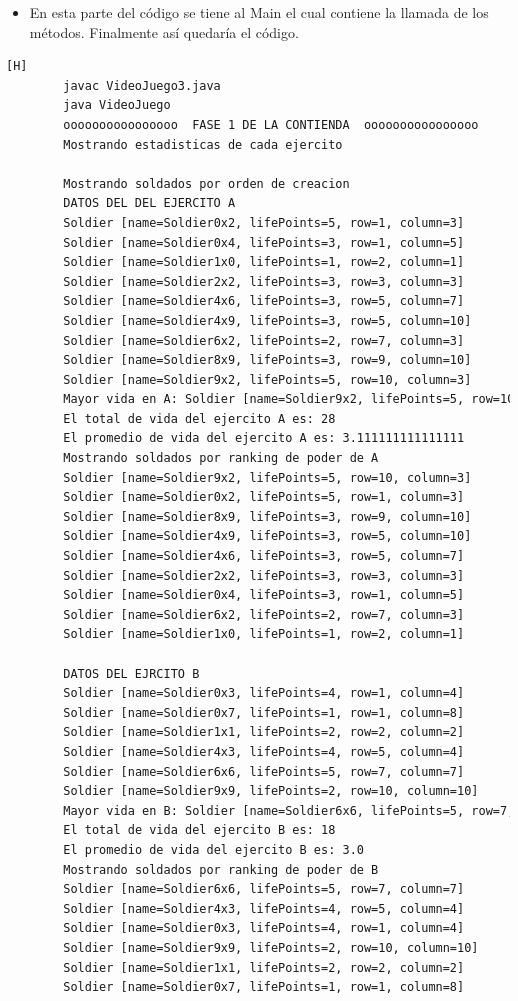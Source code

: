 \documentclass{article}
\begin{document}
	\begin{itemize}	
		\item En esta parte del código se tiene al Main el cual contiene la llamada de los métodos. Finalmente así quedaría el código.
	\end{itemize}
	
	
	\begin{lstlisting}[language=bash,caption={Compilando y probando el codigo en su versión final }][H]
		javac VideoJuego3.java
		java VideoJuego
		oooooooooooooooo  FASE 1 DE LA CONTIENDA  oooooooooooooooo
		Mostrando estadisticas de cada ejercito
		
		Mostrando soldados por orden de creacion
		DATOS DEL DEL EJERCITO A
		Soldier [name=Soldier0x2, lifePoints=5, row=1, column=3]
		Soldier [name=Soldier0x4, lifePoints=3, row=1, column=5]
		Soldier [name=Soldier1x0, lifePoints=1, row=2, column=1]
		Soldier [name=Soldier2x2, lifePoints=3, row=3, column=3]
		Soldier [name=Soldier4x6, lifePoints=3, row=5, column=7]
		Soldier [name=Soldier4x9, lifePoints=3, row=5, column=10]
		Soldier [name=Soldier6x2, lifePoints=2, row=7, column=3]
		Soldier [name=Soldier8x9, lifePoints=3, row=9, column=10]
		Soldier [name=Soldier9x2, lifePoints=5, row=10, column=3]
		Mayor vida en A: Soldier [name=Soldier9x2, lifePoints=5, row=10, column=3]
		El total de vida del ejercito A es: 28
		El promedio de vida del ejercito A es: 3.111111111111111
		Mostrando soldados por ranking de poder de A
		Soldier [name=Soldier9x2, lifePoints=5, row=10, column=3]
		Soldier [name=Soldier0x2, lifePoints=5, row=1, column=3]
		Soldier [name=Soldier8x9, lifePoints=3, row=9, column=10]
		Soldier [name=Soldier4x9, lifePoints=3, row=5, column=10]
		Soldier [name=Soldier4x6, lifePoints=3, row=5, column=7]
		Soldier [name=Soldier2x2, lifePoints=3, row=3, column=3]
		Soldier [name=Soldier0x4, lifePoints=3, row=1, column=5]
		Soldier [name=Soldier6x2, lifePoints=2, row=7, column=3]
		Soldier [name=Soldier1x0, lifePoints=1, row=2, column=1]
		
		DATOS DEL EJRCITO B
		Soldier [name=Soldier0x3, lifePoints=4, row=1, column=4]
		Soldier [name=Soldier0x7, lifePoints=1, row=1, column=8]
		Soldier [name=Soldier1x1, lifePoints=2, row=2, column=2]
		Soldier [name=Soldier4x3, lifePoints=4, row=5, column=4]
		Soldier [name=Soldier6x6, lifePoints=5, row=7, column=7]
		Soldier [name=Soldier9x9, lifePoints=2, row=10, column=10]
		Mayor vida en B: Soldier [name=Soldier6x6, lifePoints=5, row=7, column=7]
		El total de vida del ejercito B es: 18
		El promedio de vida del ejercito B es: 3.0
		Mostrando soldados por ranking de poder de B
		Soldier [name=Soldier6x6, lifePoints=5, row=7, column=7]
		Soldier [name=Soldier4x3, lifePoints=4, row=5, column=4]
		Soldier [name=Soldier0x3, lifePoints=4, row=1, column=4]
		Soldier [name=Soldier9x9, lifePoints=2, row=10, column=10]
		Soldier [name=Soldier1x1, lifePoints=2, row=2, column=2]
		Soldier [name=Soldier0x7, lifePoints=1, row=1, column=8]
		

\end{lstlisting}
\end{document}
